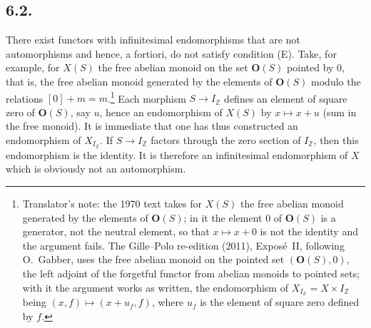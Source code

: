\subsection*{6.2.}
There exist functors with infinitesimal endomorphisms that are not
automorphisms and hence, a fortiori, do not satisfy condition (E).
Take, for example, for \(X(S)\) the free abelian monoid on the set
\(\mathbf O(S)\) pointed by \(0\), that is, the free abelian monoid
generated by the elements of \(\mathbf O(S)\) modulo the relations
\([0]+m=m\).\footnote{Translator's note: the 1970 text takes for \(X(S)\)
the free abelian monoid generated by the elements of \(\mathbf O(S)\); in
it the element \(0\) of \(\mathbf O(S)\) is a generator, not the neutral
element, so that \(x\mapsto x+0\) is not the identity and the argument
fails. The Gille--Polo re-edition (2011), Expos\'e~II, following O.~Gabber,
uses the free abelian monoid on the pointed set \((\mathbf O(S),0)\), the
left adjoint of the forgetful functor from abelian monoids to pointed sets;
with it the argument works as written, the endomorphism of
\(X_{I_{\mathbb Z}}=X\times I_{\mathbb Z}\) being \((x,f)\mapsto(x+u_f,f)\),
where \(u_f\) is the element of square zero defined by \(f\).} Each morphism \(S\to I_{\mathbb Z}\) defines an element of
square zero of \(\mathbf O(S)\), say \(u\), hence an endomorphism of
\(X(S)\) by \(x\mapsto x+u\) (sum in the free monoid). It is immediate that
one has thus constructed an endomorphism of \(X_{I_{\mathbb Z}}\). If
\(S\to I_{\mathbb Z}\) factors through the zero section of
\(I_{\mathbb Z}\), then this endomorphism is the identity. It is therefore
an infinitesimal endomorphism of \(X\) which is obviously not an
automorphism.

